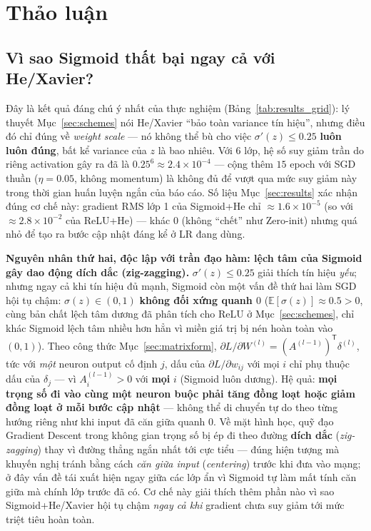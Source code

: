 \documentclass[12pt,a4paper]{article}
\newcommand{\en}[1]{\textit{#1}}
\newcommand{\T}{^{\mathsf{T}}}
\begin{document}
\section{Thảo luận}
\label{sec:discussion}

\subsection{Vì sao Sigmoid thất bại ngay cả với He/Xavier?}

Đây là kết quả
đáng chú ý nhất của thực nghiệm (Bảng~\ref{tab:results_grid}): lý thuyết
Mục~\ref{sec:schemes} nói He/Xavier ``bảo toàn variance tín hiệu'', nhưng
điều đó chỉ đúng về \emph{weight scale} --- nó không thể bù cho việc
$\sigma'(z)\le0.25$ \textbf{luôn luôn đúng}, bất kể variance của $z$ là
bao nhiêu. Với 6 lớp, hệ số suy giảm trần do riêng activation gây ra đã là
$0.25^6\approx2.4\times10^{-4}$ --- cộng thêm $15$ epoch với SGD thuần
($\eta=0.05$, không momentum) là không đủ để vượt qua mức suy giảm này
trong thời gian huấn luyện ngắn của báo cáo. Số liệu Mục~\ref{sec:results}
xác nhận đúng cơ chế này: gradient RMS lớp 1 của Sigmoid+He chỉ
$\approx1.6\times10^{-5}$ (so với $\approx2.8\times10^{-2}$ của
ReLU+He) --- khác $0$ (không ``chết'' như Zero-init) nhưng quá nhỏ để tạo ra
bước cập nhật đáng kể ở LR đang dùng.

\textbf{Nguyên nhân thứ hai, độc lập với trần đạo hàm: lệch tâm của
Sigmoid gây dao động dích dắc (zig-zagging).} $\sigma'(z)\le0.25$ giải
thích tín hiệu \emph{yếu}; nhưng ngay cả khi tín hiệu đủ mạnh, Sigmoid còn
một vấn đề thứ hai làm SGD hội tụ chậm: $\sigma(z)\in(0,1)$
\textbf{không đối xứng quanh $0$} ($\mathbb E[\sigma(z)]\approx0.5>0$,
cùng bản chất lệch tâm dương đã phân tích cho ReLU ở Mục~\ref{sec:schemes},
chỉ khác Sigmoid lệch tâm nhiều hơn hẳn vì miền giá trị bị nén hoàn toàn
vào $(0,1)$). Theo công thức Mục~\ref{sec:matrixform},
$\partial L/\partial W^{(l)}=(A^{(l-1)})\T\delta^{(l)}$, tức với \emph{một}
neuron output cố định $j$, dấu của $\partial L/\partial w_{ij}$ với mọi
$i$ chỉ phụ thuộc dấu của $\delta_j$ --- vì $A^{(l-1)}_{i}>0$ với
\textbf{mọi} $i$ (Sigmoid luôn dương). Hệ quả: \textbf{mọi trọng số đi vào
cùng một neuron buộc phải tăng đồng loạt hoặc giảm đồng loạt ở mỗi bước
cập nhật} --- không thể di chuyển tự do theo từng hướng riêng như khi input
đã căn giữa quanh $0$. Về mặt hình học, quỹ đạo Gradient Descent trong
không gian trọng số bị ép đi theo đường \textbf{dích dắc}
(\en{zig-zagging}) thay vì đường thẳng ngắn nhất tới cực tiểu --- đúng
hiện tượng mà \citet{lecun1998efficient} khuyến nghị tránh bằng cách
\emph{căn giữa input} (\en{centering}) trước khi đưa vào mạng; ở đây vấn
đề tái xuất hiện ngay giữa các lớp ẩn vì Sigmoid tự làm mất tính căn giữa
mà chính lớp trước đã có. Cơ chế này giải thích thêm phần nào vì sao
Sigmoid+He/Xavier hội tụ chậm \emph{ngay cả khi} gradient chưa suy giảm
tới mức triệt tiêu hoàn toàn.
\end{document}
